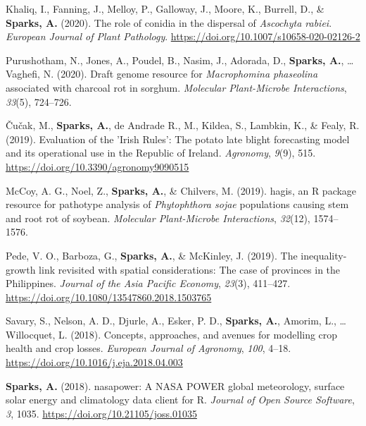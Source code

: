 \documentclass[11pt, a4paper]{awesome-cv}
\begin{document}
\leavevmode{}%
Khaliq, I., Fanning, J., Melloy, P., Galloway, J., Moore, K., Burrell,
D., \& \textbf{Sparks, A.} (2020). The role of conidia in the dispersal
of \emph{{Ascochyta} rabiei}. \emph{European Journal of Plant
Pathology}. \url{https://doi.org/10.1007/s10658-020-02126-2}

\leavevmode{}%
Purushotham, N., Jones, A., Poudel, B., Nasim, J., Adorada, D.,
\textbf{Sparks, A.}, \ldots{} Vaghefi, N. (2020). Draft genome resource
for \emph{{Macrophomina} phaseolina} associated with charcoal rot in
sorghum. \emph{Molecular Plant-Microbe Interactions}, \emph{33}(5),
724--726.

\leavevmode{}%
Čučak, M., \textbf{Sparks, A.}, de Andrade R., M., Kildea, S., Lambkin,
K., \& Fealy, R. (2019). Evaluation of the {{'}Irish Rules{'}}: The
potato late blight forecasting model and its operational use in the
{Republic of Ireland}. \emph{Agronomy}, \emph{9}(9), 515.
\url{https://doi.org/10.3390/agronomy9090515}

\leavevmode{}%
McCoy, A. G., Noel, Z., \textbf{Sparks, A.}, \& Chilvers, M. (2019).
{hagis}, an {R} package resource for pathotype analysis of
\emph{{Phytophthora} sojae} populations causing stem and root rot of
soybean. \emph{Molecular Plant-Microbe Interactions}, \emph{32}(12),
1574--1576.

\leavevmode{}%
Pede, V. O., Barboza, G., \textbf{Sparks, A.}, \& McKinley, J. (2019).
The inequality-growth link revisited with spatial considerations: The
case of provinces in the {Philippines}. \emph{Journal of the Asia
Pacific Economy}, \emph{23}(3), 411--427.
\url{https://doi.org/10.1080/13547860.2018.1503765}

\leavevmode{}%
Savary, S., Nelson, A. D., Djurle, A., Esker, P. D.,
\textbf{Sparks, A.}, Amorim, L., \ldots{} Willocquet, L. (2018).
Concepts, approaches, and avenues for modelling crop health and crop
losses. \emph{European Journal of Agronomy}, \emph{100}, 4--18.
\url{https://doi.org/10.1016/j.eja.2018.04.003}

\leavevmode{}%
\textbf{Sparks, A.} (2018). {nasapower}: {A NASA POWER} global
meteorology, surface solar energy and climatology data client for {R}.
\emph{Journal of Open Source Software}, \emph{3}, 1035.
\url{https://doi.org/10.21105/joss.01035}
\end{document}
